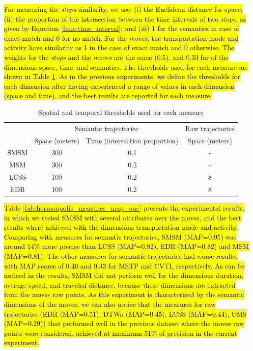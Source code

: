 \documentclass[12pt]{article}
\begin{document}
\hl{For measuring the \emph{stops} similarity, we use: (i) the Euclidean distance for space; (ii) the proportion of the intersection between the time intervals of two \emph{stops}, as given by Equation {\ref{func:time_interval}}; and (iii) 1 for the semantics in case of exact match and 0 for no match. For the \emph{moves}, the transportation mode and activity have  similarity as 1 in the case of exact match and 0 otherwise. The weights for the \emph{stops} and the \emph{moves} are the same ($0.5$), and $0.33$ for of the  dimensions space, time, and semantics. The thresholds used for each measure are shown in Table {\ref{tab:hermoupolis_thresholds}}.  As in the previous experiments, we define the thresholds for each dimension after having experienced a range of values in each dimension (space and time), and the best results are reported for each measure.}

\begin{table}[!h]
\scriptsize
  \centering
  \begin{tabular}{|c|c|c|c|}
  	\hline
  & \multicolumn{2}{c|}{Semantic trajectories} & \multicolumn{1}{c|}{Raw trajectories} \\
 	\cline{2-4}
  & Space (meters)& Time (intersection proportion) & Space (meters) \\
  	\hline
 SMSM & 300 & 0.1 & - \\
 MSM & 300 & 0.2 & - \\
 LCSS & 100 & 0.2 & 8 \\
 EDR & 100 & 0.2 & 8 \\
    \hline
  \end{tabular}
  \caption{Spatial and temporal thresholds used for each measure}
  \label{tab:hermoupolis_thresholds}
\end{table}

\hl{Table {\ref{tab:hermoupolis_measures_map_auc}} presents the experimental results, in which we tested SMSM with several  attributes over the moves, and the best results where achieved with the dimensions transportation mode and activity. Comparing with measures for semantic trajectories, SMSM (MAP=0.95) was around 14\% more precise than LCSS (MAP=0.82), EDR (MAP=0.82) and MSM (MAP=0.81). The other measures for semantic trajectories had worse results, with MAP scores of 0.40 and 0.33 for MSTP and CVTI, respectively. As can be noticed in the results,  SMSM did not perform well for the dimensions duration, average speed, and traveled distance, because these dimensions are extracted from the moves raw points. As this experiment is characterized by the semantic dimensions of the moves, we can also notice that the measures for raw trajectories (EDR (MAP=0.51), DTWa (MAP=0.45), LCSS (MAP=0.44), UMS (MAP=0.29)) that performed well in the previous dataset where the moves raw points were considered, achieved at maximum 51\% of precision in the current experiment.}
\end{document}

